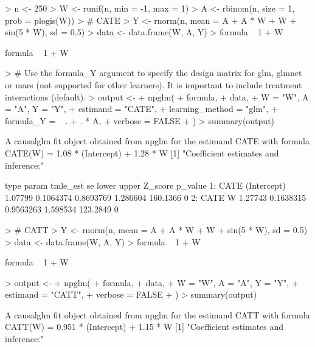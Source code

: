 \documentclass{article}
\begin{document}
\begin{Schunk}
\begin{Sinput}
> n <- 250
> W <- runif(n, min = -1, max = 1)
> A <- rbinom(n, size = 1, prob = plogis(W))
> # CATE
> Y <- rnorm(n, mean = A + A * W + W + sin(5 * W), sd = 0.5)
> data <- data.frame(W, A, Y)
> formula ~ 1 + W
\end{Sinput}
\begin{Soutput}
formula ~ 1 + W
\end{Soutput}
\begin{Sinput}
> # Use the formula_Y argument to specify the design matrix for glm, glmnet or mars (not supported for other learners). It is important to include treatment interactions (default).
> output <-
+   npglm(
+     formula,
+     data,
+     W = "W", A = "A", Y = "Y",
+     estimand = "CATE",
+     learning_method = "glm",
+     formula_Y = ~ . + . * A,
+     verbose = FALSE
+   )
> summary(output)
\end{Sinput}
\begin{Soutput}
A causalglm fit object obtained from npglm for the estimand CATE with formula 
CATE(W) = 1.08 * (Intercept) + 1.28 * W
[1] "Coefficient estimates and inference:"

   type       param tmle_est        se     lower    upper  Z_score p_value
1: CATE (Intercept)  1.07799 0.1064374 0.8693769 1.286604 160.1366       0
2: CATE           W  1.27743 0.1638315 0.9563263 1.598534 123.2849       0
\end{Soutput}
\begin{Sinput}
> # CATT
> Y <- rnorm(n, mean = A + A * W + W + sin(5 * W), sd = 0.5)
> data <- data.frame(W, A, Y)
> formula ~ 1 + W
\end{Sinput}
\begin{Soutput}
formula ~ 1 + W
\end{Soutput}
\begin{Sinput}
> output <-
+   npglm(
+     formula,
+     data,
+     W = "W", A = "A", Y = "Y",
+     estimand = "CATT",
+     verbose = FALSE
+   )
> summary(output)
\end{Sinput}
\begin{Soutput}
A causalglm fit object obtained from npglm for the estimand CATT with formula 
CATT(W) = 0.951 * (Intercept) + 1.15 * W
[1] "Coefficient estimates and inference:"


\end{Soutput}
\end{Schunk}
\end{document}
